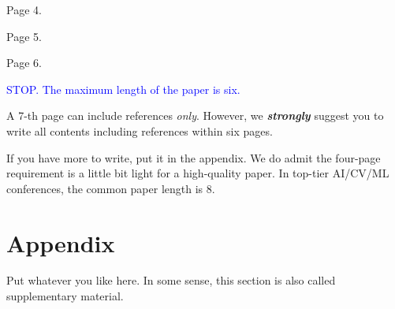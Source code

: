 \documentclass{article}
\begin{document}




\clearpage
Page 4.

\clearpage
Page 5.

\clearpage
Page 6.

\clearpage
\textcolor{blue}{STOP. The maximum length of the paper is six.}

A 7-th page can include references \textit{only}. However, we \textit{\textbf{strongly}} suggest you to
write all contents including references within six pages.

If you have more to write, put it in the appendix. We do admit the four-page requirement is a little bit light for a high-quality paper. In top-tier AI/CV/ML conferences, the common paper length is 8.

\clearpage
\section*{Appendix}
Put whatever you like here. In some sense, this section is also called supplementary material.
\end{document}
